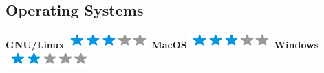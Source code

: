 \documentclass[]{friggeri-cv}
\begin{document}
\begin{aside}
  \section{Operating Systems}
    \textbf{GNU/Linux}\includegraphics[scale=0.40]{img/3stars.png}
    \textbf{MacOS}\includegraphics[scale=0.40]{img/3stars.png}
    \textbf{Windows}\includegraphics[scale=0.40]{img/2stars.png}
\end{aside}
\end{document}
